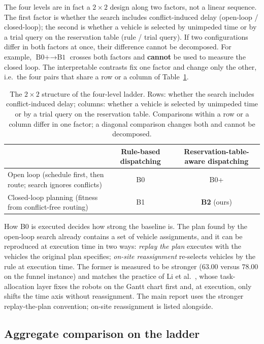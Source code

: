 The four levels are in fact a $2\times2$ design along two factors, not a linear sequence. The first factor is whether the search includes conflict-induced delay (open-loop / closed-loop); the second is whether a vehicle is selected by unimpeded time or by a trial query on the reservation table (rule / trial query).
If two configurations differ in both factors at once, their difference cannot be decomposed.
For example, $\text{B0+}\to\text{B1}$ crosses both factors and \textbf{cannot} be used to measure the closed loop.
The interpretable contrasts fix one factor and change only the other, i.e.\ the four pairs that share a row or a column of Table~\ref{tab:arms}.

\begin{table}[t]
\caption{The $2\times2$ structure of the four-level ladder. Rows: whether the search includes conflict-induced delay; columns: whether a vehicle is selected by unimpeded time or by a trial query on the reservation table.
Comparisons within a row or a column differ in one factor; a diagonal comparison changes both and cannot be decomposed.}
\label{tab:arms}
\footnotesize
\begin{tabular}{@{}lcc@{}}
\toprule
 & Rule-based dispatching & Reservation-table-aware dispatching \\
\midrule
Open loop (schedule first, then route; search ignores conflicts) & B0 & B0+ \\
Closed-loop planning (fitness from conflict-free routing) & B1 & \textbf{B2} (ours) \\
\bottomrule
\end{tabular}
\end{table}

How B0 is executed decides how strong the baseline is. The plan found by the open-loop search already contains a set of vehicle assignments, and it can be reproduced at execution time in two ways:
\emph{replay the plan} executes with the vehicles the original plan specifies; \emph{on-site reassignment} re-selects vehicles by the rule at execution time.
The former is measured to be stronger ($63.00$ versus $78.00$ on the funnel instance) and matches the practice of Li et al.~\cite{li2026framework}, whose task-allocation layer fixes the robots on the Gantt chart first and, at execution, only shifts the time axis without reassignment.
The main report uses the stronger replay-the-plan convention; on-site reassignment is listed alongside.

\subsection{Aggregate comparison on the ladder}
\label{sec:main}

